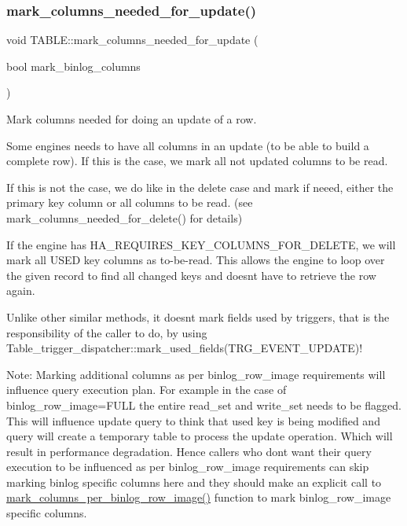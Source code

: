 \subsubsection{\texorpdfstring{mark\+\_\+columns\+\_\+needed\+\_\+for\+\_\+update()}{mark\_columns\_needed\_for\_update()}}
{\footnotesize\ttfamily void T\+A\+B\+L\+E\+::mark\+\_\+columns\+\_\+needed\+\_\+for\+\_\+update (\begin{DoxyParamCaption}\item[{bool}]{mark\+\_\+binlog\+\_\+columns }\end{DoxyParamCaption})}



Mark columns needed for doing an update of a row. 

Some engines needs to have all columns in an update (to be able to build a complete row). If this is the case, we mark all not updated columns to be read.

If this is not the case, we do like in the delete case and mark if neeed, either the primary key column or all columns to be read. (see mark\+\_\+columns\+\_\+needed\+\_\+for\+\_\+delete() for details)

If the engine has H\+A\+\_\+\+R\+E\+Q\+U\+I\+R\+E\+S\+\_\+\+K\+E\+Y\+\_\+\+C\+O\+L\+U\+M\+N\+S\+\_\+\+F\+O\+R\+\_\+\+D\+E\+L\+E\+TE, we will mark all U\+S\+ED key columns as \textquotesingle{}to-\/be-\/read\textquotesingle{}. This allows the engine to loop over the given record to find all changed keys and doesn\textquotesingle{}t have to retrieve the row again.

Unlike other similar methods, it doesn\textquotesingle{}t mark fields used by triggers, that is the responsibility of the caller to do, by using Table\+\_\+trigger\+\_\+dispatcher\+::mark\+\_\+used\+\_\+fields(\+T\+R\+G\+\_\+\+E\+V\+E\+N\+T\+\_\+\+U\+P\+D\+A\+T\+E)!

Note\+: Marking additional columns as per binlog\+\_\+row\+\_\+image requirements will influence query execution plan. For example in the case of binlog\+\_\+row\+\_\+image=F\+U\+LL the entire read\+\_\+set and write\+\_\+set needs to be flagged. This will influence update query to think that \textquotesingle{}used key is being modified\textquotesingle{} and query will create a temporary table to process the update operation. Which will result in performance degradation. Hence callers who don\textquotesingle{}t want their query execution to be influenced as per binlog\+\_\+row\+\_\+image requirements can skip marking binlog specific columns here and they should make an explicit call to \textquotesingle{}\mbox{\hyperlink{structTABLE_a80aa5acb1308e30d425ab0c9b07fa809}{mark\+\_\+columns\+\_\+per\+\_\+binlog\+\_\+row\+\_\+image()}}\textquotesingle{} function to mark binlog\+\_\+row\+\_\+image specific columns. \mbox{\label{structTABLE_a80aa5acb1308e30d425ab0c9b07fa809}} 
